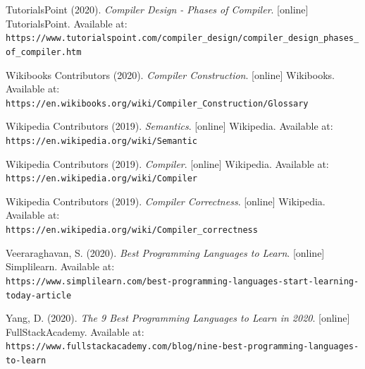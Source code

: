 \documentclass[
]{report}
\begin{document}
\begin{thebibliography}{24}
	TutorialsPoint (2020).
	\textit{Compiler Design - Phases of Compiler}.
	[online] TutorialsPoint. Available at:
	\\\texttt{https://www.tutorialspoint.com/compiler\_design/compiler\_design\_phases\_of\_compiler.htm}
	
	Wikibooks Contributors (2020).
	\textit{Compiler Construction}.
	[online] Wikibooks. Available at:
	\\\texttt{https://en.wikibooks.org/wiki/Compiler\_Construction/Glossary}
	
	Wikipedia Contributors (2019).
	\textit{Semantics}.
	[online] Wikipedia. Available at:
	\\\texttt{https://en.wikipedia.org/wiki/Semantic}
	
	Wikipedia Contributors (2019).
	\textit{Compiler}.
	[online] Wikipedia. Available at:
	\\\texttt{https://en.wikipedia.org/wiki/Compiler}
	
	Wikipedia Contributors (2019).
	\textit{Compiler Correctness}.
	[online] Wikipedia. Available at:
	\\\texttt{https://en.wikipedia.org/wiki/Compiler\_correctness}
	
	Veeraraghavan, S. (2020).
	\textit{Best Programming Languages to Learn}.
	[online] Simplilearn. Available at:
	\\\texttt{https://www.simplilearn.com/best-programming-languages-start-learning-today-article}
	
	Yang, D. (2020).
	\textit{The 9 Best Programming Languages to Learn in 2020}.
	[online] FullStackAcademy. Available at:
	\\\texttt{https://www.fullstackacademy.com/blog/nine-best-programming-languages-to-learn}

\end{thebibliography}

\printglossary
\end{document}
